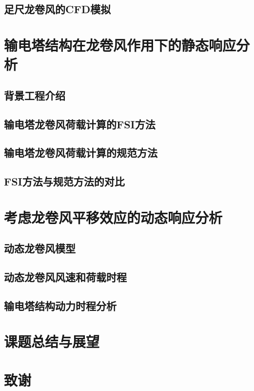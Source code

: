 \documentclass[]{beamer}
\begin{document}
\subsection{足尺龙卷风的CFD模拟}

\section{输电塔结构在龙卷风作用下的静态响应分析}
\subsection{背景工程介绍}
\subsection{输电塔龙卷风荷载计算的FSI方法}
\subsection{输电塔龙卷风荷载计算的规范方法}
\subsection{FSI方法与规范方法的对比}

\section{考虑龙卷风平移效应的动态响应分析}
\subsection{动态龙卷风模型}
\subsection{动态龙卷风风速和荷载时程}
\subsection{输电塔结构动力时程分析}

\section{课题总结与展望}

\section{致谢}
\end{document}

